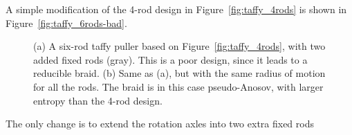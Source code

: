 \documentclass[12pt]{article}
\begin{document}
A simple modification of the 4-rod design in Figure~\ref{fig:taffy_4rods} is
shown in Figure~\ref{fig:taffy_6rods-bad}.
%
\begin{figure}
\begin{center}
\hspace{1em}
\end{center}
\caption{(a) A six-rod taffy puller based on Figure~\ref{fig:taffy_4rods},
  with two added fixed rods (gray).  This is a poor design, since it leads to
  a reducible braid. %
  (b) Same as (a), but with the same radius of motion for all the rods.  The
  braid is in this case pseudo-Anosov, with larger entropy than the 4-rod
  design.}
\label{fig:taffy_6rods-improved}
\end{figure}
%
The only change is to extend the rotation axles into two extra fixed rods
\end{document}
